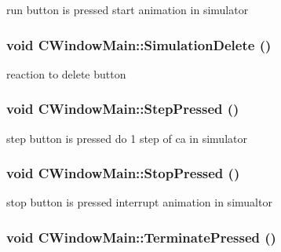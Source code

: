 \label{classCWindowMain_ac6aaa339ff3d4812de61092cc953c2ac}
run button is pressed start animation in simulator \hypertarget{classCWindowMain_ad73f9e5ab904f02091259c478caa6ac3}{
\subsubsection[{SimulationDelete}]{\setlength{\rightskip}{0pt plus 5cm}void CWindowMain::SimulationDelete ()}}
\label{classCWindowMain_ad73f9e5ab904f02091259c478caa6ac3}
reaction to delete button \hypertarget{classCWindowMain_a13929df83f0165db58ad16c0d90fa092}{
\subsubsection[{StepPressed}]{\setlength{\rightskip}{0pt plus 5cm}void CWindowMain::StepPressed ()}}
\label{classCWindowMain_a13929df83f0165db58ad16c0d90fa092}
step button is pressed do 1 step of ca in simulator \hypertarget{classCWindowMain_a1c895ba39c0847fd25f6b734eb5f6ac3}{
\subsubsection[{StopPressed}]{\setlength{\rightskip}{0pt plus 5cm}void CWindowMain::StopPressed ()}}
\label{classCWindowMain_a1c895ba39c0847fd25f6b734eb5f6ac3}
stop button is pressed interrupt animation in simualtor \hypertarget{classCWindowMain_a0664061226a46527c08baa79c77c021e}{
\subsubsection[{TerminatePressed}]{\setlength{\rightskip}{0pt plus 5cm}void CWindowMain::TerminatePressed ()}}
